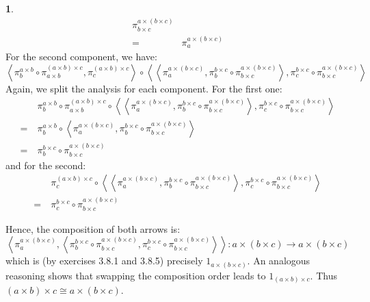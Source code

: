 \documentclass{article}
\theoremstyle{definition}
\newcommand{\ang}[1]{\left\langle #1 \right\rangle}
\theoremstyle{definition}
\newtheorem{solution-internal}{}[subsection]
\newenvironment{solution}{
  \begin{solution-internal}
}{
  \end{solution-internal}
}
\begin{document}
\begin{solution}
\begin{align*}
{\pi^{a\times(b\times c)}_{b\times c}} \\
    =~& \pi^{a\times(b\times c)}_a
  \end{align*}
  For the second component, we have:
  \[ \ang{\pi^{a\times b}_b \circ \pi^{(a\times b)\times c}_{a\times b},
  \pi^{(a\times b)\times c}_c} \circ \ang{\ang{\pi^{a\times(b\times c)}_a, \pi^{b\times c}_b \circ
\pi^{a\times(b\times c)}_{b\times c}}, \pi^{b\times c}_c \circ \pi^{a\times
(b\times c)}_{b\times c}} \]
Again, we split the analysis for each component. For the first one:
  \begin{align*}
    & \pi^{a\times b}_b \circ \pi^{(a\times b)\times c}_{a\times b} \circ \ang{\ang{\pi^{a\times(b\times c)}_a, \pi^{b\times c}_b \circ
\pi^{a\times(b\times c)}_{b\times c}}, \pi^{b\times c}_c \circ \pi^{a\times
(b\times c)}_{b\times c}} \\
    =~& \pi^{a\times b}_b \circ \ang{\pi^{a\times(b\times c)}_a, \pi^{b\times
    c}_b \circ \pi^{a\times(b\times c)}_{b\times c}} \\
    =~& \pi^{b\times c}_b \circ \pi^{a\times(b\times c)}_{b\times c}
  \end{align*}
  and for the second:
  \begin{align*}
    & \pi^{(a\times b)\times c}_c \circ \ang{\ang{\pi^{a\times(b\times c)}_a, \pi^{b\times c}_b \circ
\pi^{a\times(b\times c)}_{b\times c}}, \pi^{b\times c}_c \circ \pi^{a\times
(b\times c)}_{b\times c}} \\
  =~& \pi^{b\times c}_c \circ \pi^{a\times (b\times c)}_{b\times c}
  \end{align*}

Hence, the composition of both arrows is:
\[ \ang{\pi^{a\times(b\times c)}_a, \ang{\pi^{b\times c}_b \circ
\pi^{a\times(b\times c)}_{b\times c},\pi^{b\times c}_c \circ \pi^{a\times
(b\times c)}_{b\times c}}} \colon a \times (b \times c) \to a \times (b \times c) \]
which is (by exercises 3.8.1 and 3.8.5) precisely $1_{a\times (b\times c)}$.
An analogous reasoning shows that swapping the composition order leads to
$1_{(a\times b) \times c}$. Thus $(a \times b) \times c \cong a \times (b \times c)$.
\end{solution}
\end{document}
